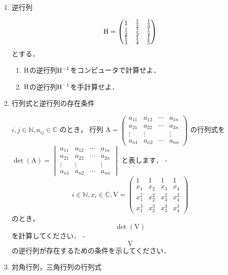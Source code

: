 \begin{enumerate}[label=問\arabic*.]
  \item 逆行列

    \begin{equation}
      \mathrm{H} =
        \begin{pmatrix}
                     1 & \frac{1}{2} & \frac{1}{3} \\
           \frac{1}{2} & \frac{1}{3} & \frac{1}{4} \\
           \frac{1}{3} & \frac{1}{4} & \frac{1}{5}
        \end{pmatrix}
    \end{equation}
    とする．
    \begin{enumerate}{label=(\roman*)}
      \item $\mathrm{H}$の逆行列$\mathrm{H}^{-1}$をコンピュータで計算せよ．
      \item $\mathrm{H}$の逆行列$\mathrm{H}^{-1}$を手計算せよ．
    \end{enumerate}

  \item 行列式と逆行列の存在条件

    $i, j \in \mathbb{N}, a_{ij} \in \mathbb{C}$ のとき，
    行列 $\mathrm{A}= \begin{pmatrix} a_{11} & a_{12} & \cdots & a_{1n} \\ a_{21} & a_{22} & \cdots & a_{2n} \\ \vdots & \vdots & & \vdots \\ a_{n1} & a_{n2} & \cdots & a_{nn} \end{pmatrix} $
    の行列式を$\det{(\mathrm{A})} = \begin{vmatrix} a_{11} & a_{12} & \cdots & a_{1n} \\ a_{21} & a_{22} & \cdots & a_{2n} \\ \vdots & \vdots & & \vdots \\ a_{n1} & a_{n2} & \cdots & a_{nn} \end{vmatrix}$ と表します．
    - $$i \in \mathbb{N}, x_i \in \mathbb{C}, \mathrm{V}= \left( \begin{array}{rrrr} 1 & 1 & 1 & 1 \\ x_1 & x_2 & x_3 & x_4 \\ x_1^2 & x_2^2 & x_3^2 & x_4^2 \\ x_1^3 & x_2^3 & x_3^3 & x_4^3 \end{array} \right)$$ のとき，
        $$\det{(\mathrm{V})}$$を計算してください．
    - $$\mathrm{V}$$の逆行列が存在するための条件を示してください．

  \item 対角行列，三角行列の行列式


\end{enumerate}
